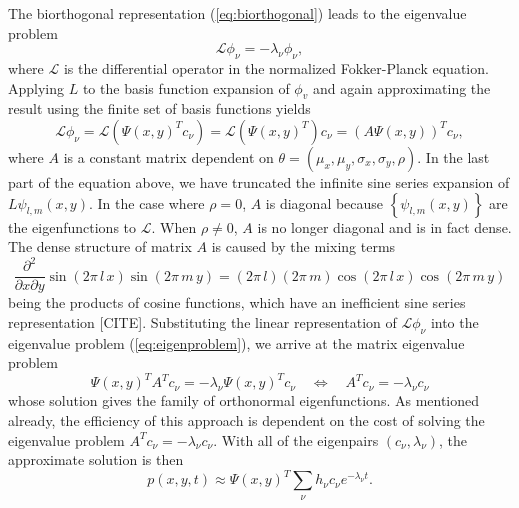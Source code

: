 \documentclass[10pt]{article}
\begin{document}
The biorthogonal representation (\ref{eq:biorthogonal}) leads to the
eigenvalue problem
\begin{equation}
  \mathcal{L} \phi_\nu = -\lambda_\nu \phi_\nu, \label{eq:eigenproblem}
\end{equation}
where $\mathcal{L}$ is the differential operator in the normalized
Fokker-Planck equation. Applying $L$ to the basis function expansion
of $\phi_v $ and again approximating the result using the finite set
of basis functions yields
\[
  \mathcal{L}\phi_\nu = \mathcal{L}(\Psi(x,y)^T c_\nu) =
  \mathcal{L}(\Psi(x,y)^T) c_\nu = (A \Psi(x,y))^T c_\nu,
\] 
where $A$ is a constant matrix dependent on
$\theta = (\mu_x, \mu_y, \sigma_x, \sigma_y, \rho)$. In the last part
of the equation above, we have truncated the infinite sine series
expansion of $L \psi_{l, m}(x, y)$. In the case where $\rho = 0$, $A$
is diagonal because $\left\{ \psi_{l,m}(x,y) \right\}$ are the
eigenfunctions to $\mathcal{L}$. When $\rho \neq 0$, $A$ is no longer
diagonal and is in fact dense. The dense structure of matrix $A$ is
caused by the mixing terms
\[
  \frac{\partial^2}{\partial x \partial y} \sin\left(2\pi\, l\,
    x\right) \sin\left(2\pi\, m\, y\right) = (2\pi\, l)(2\pi\, m)
  \cos\left(2\pi\, l\, x\right) \cos\left(2\pi\, m\, y\right)
\]
being the products of cosine functions, which have an inefficient sine
series representation [CITE]. Substituting the linear representation
of $\mathcal{L}\phi_\nu$ into the eigenvalue problem
(\ref{eq:eigenproblem}), we arrive at the matrix eigenvalue problem
\[
  \Psi(x,y)^T A^T c_\nu = -\lambda_\nu \Psi(x,y)^T c_\nu
  \quad \Leftrightarrow \quad A^T c_\nu = -\lambda_\nu c_\nu
\]
whose solution gives the family of orthonormal eigenfunctions. As
mentioned already, the efficiency of this approach is dependent on the
cost of solving the eigenvalue problem
$A^T c_\nu = -\lambda_\nu c_\nu$.  With all of the eigenpairs
$(c_\nu, \lambda_\nu)$, the approximate solution is then
\[
  p(x,y,t) \approx \Psi(x,y)^T \sum_{\nu} h_\nu c_\nu e^{-\lambda_\nu t}.
\]
\end{document}
